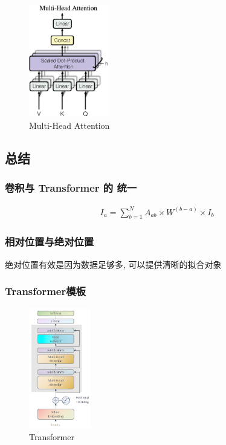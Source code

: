 \begin{figure}[!htb]
    \centering
    \includegraphics[width=0.309\textwidth]{pic/DL2/Multi-Head Attention}
    \caption{Multi-Head Attention}
\end{figure}


\subsection{总结}

\subsubsection{卷积与 Transformer 的 统一}
\begin{align*}
    I_a=\sum_{b=1}^N A_{ab}\times W^{(b-a)}\times I_b
\end{align*}


\subsubsection{相对位置与绝对位置}
绝对位置有效是因为数据足够多, 可以提供清晰的拟合对象

\subsubsection{Transformer模板}

\begin{figure}[!htb]
    \centering
    \includegraphics[width=0.24\textwidth]{pic/DL2/Transformer}
    \caption{Transformer}
\end{figure}
